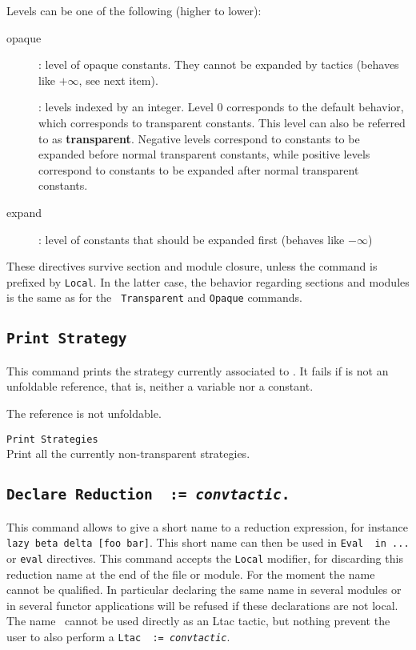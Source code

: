 Levels can be one of the following (higher to lower):
\begin{description}
\item[opaque]: level of opaque constants. They cannot be expanded by
  tactics (behaves like $+\infty$, see next item).
\item[\num]: levels indexed by an integer. Level $0$ corresponds
  to the default behavior, which corresponds to transparent
  constants. This level can also be referred to as {\bf transparent}.
  Negative levels correspond to constants to be expanded before normal
  transparent constants, while positive levels correspond to constants
  to be expanded after normal transparent constants.
\item[expand]: level of constants that should be expanded first
  (behaves like $-\infty$)
\end{description}

These directives survive section and module closure, unless the
command is prefixed by {\tt Local}. In the latter case, the behavior
regarding sections and modules is the same as for the {\tt
  Transparent} and {\tt Opaque} commands.

\subsection{{\tt Print Strategy} \label{PrintStrategy}}

This command prints the strategy currently associated to \qualid{}. It fails if
\qualid{} is not an unfoldable reference, that is, neither a variable nor a
constant.

\begin{ErrMsgs}
\item The reference is not unfoldable.
\end{ErrMsgs}

\begin{Variants}
\item {\tt Print Strategies}\\
  Print all the currently non-transparent strategies.
\end{Variants}

\subsection{\tt Declare Reduction \ident\ := {\rm\sl convtactic}.}

This command allows to give a short name to a reduction expression,
for instance {\tt lazy beta delta [foo bar]}. This short name can
then be used in {\tt Eval \ident\ in ...} or {\tt eval} directives.
This command accepts the {\tt Local} modifier, for discarding
this reduction name at the end of the file or module. For the moment
the name cannot be qualified. In particular declaring the same name
in several modules or in several functor applications will be refused
if these declarations are not local. The name \ident\ cannot be used
directly as an Ltac tactic, but nothing prevent the user to also
perform a {\tt Ltac \ident\ := {\rm\sl convtactic}}.


